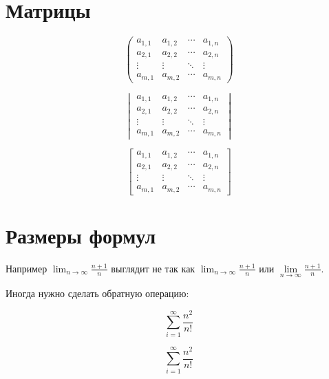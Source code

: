 \documentclass[12pt, a4paper]{article}
\begin{document}
\section{Матрицы}

\[
 \begin{pmatrix}
  a_{1,1} & a_{1,2} & \cdots & a_{1,n} \\
  a_{2,1} & a_{2,2} & \cdots & a_{2,n} \\
  \vdots  & \vdots  & \ddots & \vdots  \\
  a_{m,1} & a_{m,2} & \cdots & a_{m,n} 
 \end{pmatrix}
\]

\[
 \begin{vmatrix}
  a_{1,1} & a_{1,2} & \cdots & a_{1,n} \\
  a_{2,1} & a_{2,2} & \cdots & a_{2,n} \\
  \vdots  & \vdots  & \ddots & \vdots  \\
  a_{m,1} & a_{m,2} & \cdots & a_{m,n} 
 \end{vmatrix}
\]

\[
 \begin{bmatrix}
  a_{1,1} & a_{1,2} & \cdots & a_{1,n} \\
  a_{2,1} & a_{2,2} & \cdots & a_{2,n} \\
  \vdots  & \vdots  & \ddots & \vdots  \\
  a_{m,1} & a_{m,2} & \cdots & a_{m,n} 
 \end{bmatrix}
\]






\section{Размеры формул}


Например $\lim_{n \to \infty} \frac{n+1}{n}$ выглядит не так как $\displaystyle \lim_{n \to \infty} \frac{n+1}{n}$ или $\lim\limits_{n \to \infty} \frac{n+1}{n}$.

Иногда нужно сделать обратную операцию:

\[\sum_{i=1}^{\infty} \frac{n^2}{n!} \]

\[\textstyle \sum_{i=1}^{\infty} \frac{n^2}{n!} \]
\end{document}
